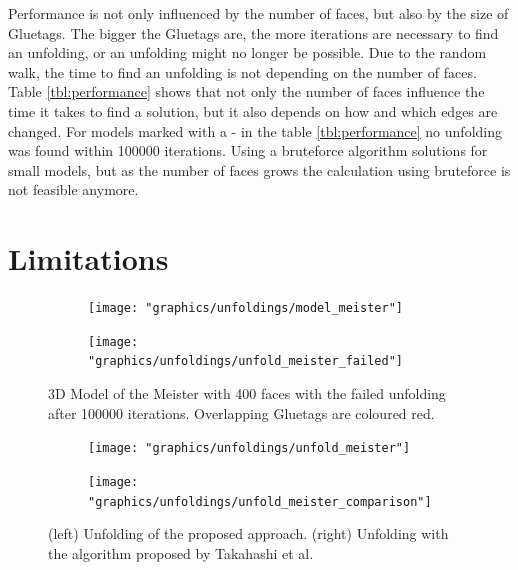 \documentclass[draft,final]{vutinfth} %
\begin{document}
\label{tbl:performance}
\endgroup

Performance is not only influenced by the number of faces, but also by the size of Gluetags. The bigger the Gluetags are, the more iterations are necessary to find an unfolding, or an unfolding might no longer be possible. Due to the random walk, the time to find an unfolding is not depending on the number of faces. Table \ref{tbl:performance} shows that not only the number of faces influence the time it takes to find a solution, but it also depends on how and which edges are changed. For models marked with a - in the table \ref{tbl:performance} no unfolding was found within 100000 iterations. Using a bruteforce algorithm solutions for small models, but as the number of faces grows the calculation using bruteforce is not feasible anymore.


\section{Limitations}
\label{sec:limitations}

\begin{figure}
  \begin{subfigure}[b]{0.475\textwidth}
    \texttt{[image: "graphics/unfoldings/model\_meister"]}
  \end{subfigure}
  \begin{subfigure}[b]{0.475\textwidth}
    \texttt{[image: "graphics/unfoldings/unfold\_meister\_failed"]}
  \end{subfigure}
  
  \caption{3D Model of the Meister with 400 faces with the failed unfolding after 100000 iterations. Overlapping Gluetags are coloured red.}
  \label{fig:meister_failed}
\end{figure}

\begin{figure}
  \begin{subfigure}[b]{0.475\textwidth}
    \texttt{[image: "graphics/unfoldings/unfold\_meister"]}
  \end{subfigure}
  \begin{subfigure}[b]{0.475\textwidth}
    \texttt{[image: "graphics/unfoldings/unfold\_meister\_comparison"]}
  \end{subfigure}
  
  \caption{(left) Unfolding of the proposed approach. (right) Unfolding with the algorithm proposed by Takahashi et al.\cite{takahashi2011optimized}}
  \label{fig:meister_comparison}
\end{figure}
\end{document}
